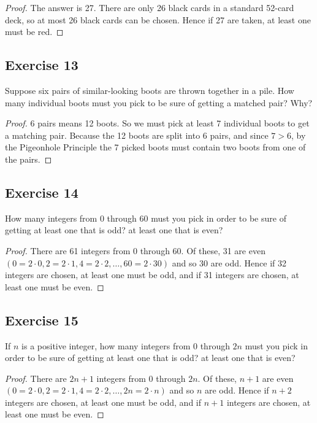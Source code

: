 \documentclass[14pt]{extarticle}
\begin{document}
\begin{proof}
The answer is 27. There are only 26 black cards in a standard 52-card deck, so at most 26 black cards can be 
chosen. Hence if 27 are taken, at least one must be red.
\end{proof}

\subsection{Exercise 13}
Suppose six pairs of similar-looking boots are thrown together in a pile. How many individual boots must you pick 
to be sure of getting a matched pair? Why?

\begin{proof}
6 pairs means 12 boots. So we must pick at least 7 individual boots to get a matching pair. Because the 12 
boots are split into 6 pairs, and since \(7>6\), by the Pigeonhole Principle the 7 picked boots must contain two
boots from one of the pairs.
\end{proof}

\subsection{Exercise 14}
How many integers from 0 through 60 must you pick in order to be sure of getting at least one that is odd? at least 
one that is even?

\begin{proof}
There are 61 integers from 0 through 60. Of these, 31 are even \((0 = 2 \cdot 0, 2 = 2 \cdot 1, 4 = 2 \cdot 2, 
\ldots, 60 = 2 \cdot 30)\) and so 30 are odd. Hence if 32 integers are chosen, at least one must be odd, and if 31 
integers are chosen, at least one must be even.
\end{proof}

\subsection{Exercise 15}
If \(n\) is a positive integer, how many integers from 0
through \(2n\) must you pick in order to be sure of getting 
at least one that is odd? at least one that is even?

\begin{proof}
There are \(2n+1\) integers from 0 through \(2n\). Of these, \(n+1\) are even \((0 = 2 \cdot 0, 2 = 2 \cdot 1, 4 
= 2 \cdot 2, \ldots, 2n = 2 \cdot n)\) and so \(n\) are odd. Hence if \(n+2\) integers are chosen, at least one 
must be odd, and if \(n+1\) integers are chosen, at least one must be even.
\end{proof}
\end{document}

